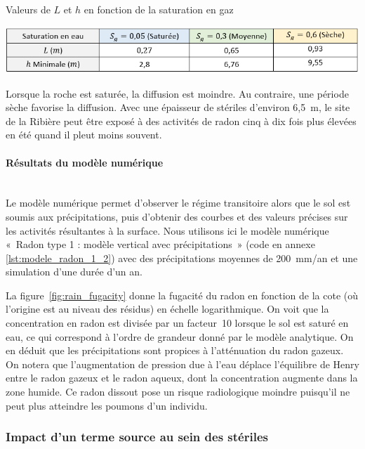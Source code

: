 \documentclass{article}
\begin{document}
\begin{table}[H]
    \centering
    \caption{Valeurs de $L$ et $h$ en fonction de la saturation en gaz}
    \includegraphics[width = \linewidth]{III_C_4.png}
    \label{tab:tableau_saturation}
\end{table}

Lorsque la roche est saturée, la diffusion est moindre. Au contraire, une période sèche favorise la diffusion. Avec une épaisseur de stériles d'environ 6,5~m, le site de la Ribière peut être exposé à des activités de radon cinq à dix fois plus élevées en été quand il pleut moins souvent.

\paragraph{Résultats du modèle numérique \\ \\} Le modèle numérique permet d’observer le régime transitoire alors que le sol est soumis aux précipitations, puis d'obtenir des courbes et des valeurs précises sur les activités résultantes à la surface. Nous utilisons ici le modèle numérique «~Radon type 1 : modèle vertical avec précipitations~» (code en annexe \ref{lst:modele_radon_1_2}) avec des précipitations moyennes de 200~mm/an et une simulation d'une durée d'un an. 

La figure~\ref{fig:rain_fugacity} donne la fugacité du radon en fonction de la cote (où l'origine est au niveau des résidus) en échelle logarithmique. On voit que la concentration en radon est divisée par un facteur~10 lorsque le sol est saturé en eau, ce qui correspond à l'ordre de grandeur donné par le modèle analytique. On en déduit que les précipitations sont propices à l’atténuation du radon gazeux. On notera que l'augmentation de pression due à l'eau déplace l’équilibre de Henry entre le radon gazeux et le radon aqueux, dont la concentration augmente dans la zone humide. Ce radon dissout pose un risque radiologique moindre puisqu'il ne peut plus atteindre les poumons d'un individu.


\subsubsection{Impact d'un terme source au sein des stériles}
\end{document}
